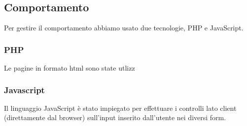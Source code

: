 \documentclass[1_relazione.tex]{subfiles}
\begin{document}
\subsection{Comportamento}
Per gestire il comportamento abbiamo usato due tecnologie, PHP e JavaScript.

\subsubsection{PHP}
Le pagine in formato html sono state utlizz


\subsubsection{Javascript}
Il linguaggio JavaScript è stato impiegato per effettuare i controlli lato client (direttamente dal browser) sull'input inserito dall'utente nei diversi form.
\end{document}
